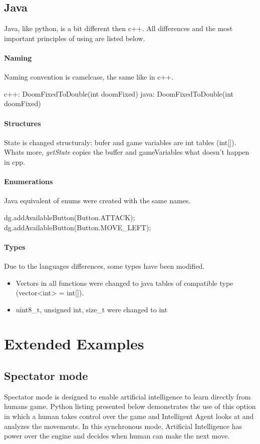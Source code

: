 \subsection{Java}
Java, like python, is a bit different then c++. All differences and the most important principles of using are listed below.

\paragraph {Naming}
 Naming convention is camelcase, the same like in c++. 
\begin{cblock}
c++: DoomFixedToDouble(int doomFixed)
java: DoomFixedToDouble(int doomFixed)
\end{cblock}
\paragraph {Structures}
State is changed structuraly: bufer and game variables are int tables (int[]). Whats more, \emph{getState} copies the buffer and gameVariables what doesn't happen in cpp. 
\paragraph {Enumerations}
Java equivalent of enums were created with the same names.
\begin{cblock}
dg.addAvailableButton(Button.ATTACK);
dg.addAvailableButton(Button.MOVE_LEFT);
\end{cblock}
\paragraph {Types}
Due to the languages differences, some types have been modified.
\begin{itemize}
\item Vectors in all functions were changed to java tables of compatible type (vector<int> = int[]).
\item uint8\_t, unsigned int, size\_t were changed to int
\end{itemize}
\section{Extended Examples}
\subsection{Spectator mode}
	Spectator mode is designed to enable artificial intelligence to learn directly from humans game.
Python listing presented below demonstrates the use of this option in which a human takes control over the game and Intelligent Agent looks at and analyzes the movements. In this synchronous mode, Artificial Intelligence has power over the engine and decides when human can make the next move. 


